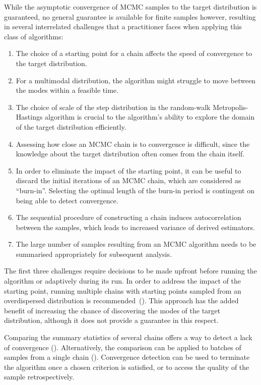 \documentclass[12pt,a4paper]{report}
\begin{document}
While the asymptotic convergence of MCMC samples to the target distribution is guaranteed, no general guarantee is available for finite samples however, resulting in several interrelated challenges that a practitioner faces when applying this class of algorithms:
\begin{enumerate}
\item The choice of a starting point for a chain affects the speed of convergence to the target distribution.
\item For a multimodal distribution, the algorithm might struggle to move between the modes within a feasible time.
\item The choice of scale of the step distribution in the random-walk Metropolis-Hastings algorithm is crucial to the algorithm's ability to explore the domain of the target distribution efficiently.
\item Assessing how close an MCMC chain is to convergence is difficult, since the knowledge about the target distribution often comes from the chain itself.
\item In order to eliminate the impact of the starting point, it can be useful to discard the initial iterations of an MCMC chain, which are considered as ``burn-in''. Selecting the optimal length of the burn-in period is contingent on being able to detect convergence.
\item The sequential procedure of constructing a chain induces autocorrelation between the samples, which leads to increased variance of derived estimators.
\item The large number of samples resulting from an MCMC algorithm needs to be summarised appropriately for subsequent analysis.
\end{enumerate}

The first three challenges require decisions to be made upfront before running the algorithm or adaptively during its run. In order to address the impact of the starting point, running multiple chains with starting points sampled from an overdispersed distribution is recommended~(\cite{gelmanInferenceIterativeSimulation1992}). This approach has the added benefit of increasing the chance of discovering the modes of the target distribution, although it does not provide a guarantee in this respect. 

Comparing the summary statistics of several chains offers a way to detect a lack of convergence (\cite{gelmanInferenceIterativeSimulation1992,brooksGeneralMethodsMonitoring1998,vehtariRankNormalizationFoldingLocalization2021}). Alternatively, the comparison can be applied to batches of samples from a single chain (\cite{vatsRevisitingGelmanRubin2021}). Convergence detection can be used to terminate the algorithm once a chosen criterion is satisfied, or to access the quality of the sample retrospectively.
\end{document}
